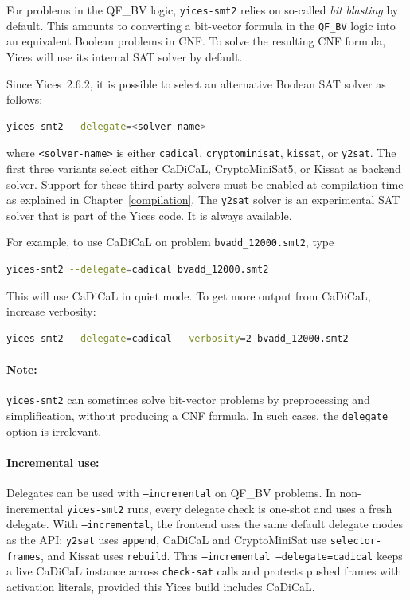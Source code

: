 \documentclass[11pt,twoside,fleqn,openright,titlepage]{cslreport}
\begin{document}
For problems in the QF\_BV logic, \texttt{yices-smt2} relies on
so-called \emph{bit blasting} by default. This amounts to
converting a bit-vector formula in the \texttt{QF\_BV} logic into an
equivalent Boolean problems in CNF. To solve the resulting CNF
formula, Yices will use its internal SAT solver by default.

\medskip\noindent
Since
Yices~2.6.2, it is possible to select an alternative Boolean SAT solver as follows:
\begin{small}
\begin{lstlisting}[language=sh]
   yices-smt2 --delegate=<solver-name>
\end{lstlisting}
\end{small}
where \texttt{<solver-name>} is either \texttt{cadical},
\texttt{cryptominisat}, \texttt{kissat}, or \texttt{y2sat}.  The first three variants
select either CaDiCaL, CryptoMiniSat5, or Kissat as backend solver. Support for these
third-party solvers must be enabled at compilation time as
explained in Chapter~\ref{compilation}. The \texttt{y2sat} solver is
an experimental SAT solver that is part of the Yices code. It is
always available.

\medskip\noindent
For example, to use CaDiCaL on problem \texttt{bvadd\_12000.smt2}, type
\begin{small}
\begin{lstlisting}[language=sh]
   yices-smt2 --delegate=cadical bvadd_12000.smt2
\end{lstlisting}
\end{small}
This will use CaDiCaL in quiet mode. To get more output from CaDiCaL, increase verbosity:
\begin{small}
\begin{lstlisting}[language=sh]
   yices-smt2 --delegate=cadical --verbosity=2 bvadd_12000.smt2
\end{lstlisting}
\end{small}

\paragraph{Note:} \texttt{yices-smt2} can sometimes solve bit-vector
problems by preprocessing and simplification, without producing a CNF
formula. In such cases, the \texttt{delegate} option is irrelevant.

\paragraph{Incremental use:} Delegates can be used with
\texttt{--incremental} on QF\_BV problems. In non-incremental
\texttt{yices-smt2} runs, every delegate check is one-shot and uses a
fresh delegate. With \texttt{--incremental}, the frontend uses the same
default delegate modes as the API: \texttt{y2sat} uses
\texttt{append}, CaDiCaL and CryptoMiniSat use
\texttt{selector-frames}, and Kissat uses \texttt{rebuild}. Thus
\texttt{--incremental --delegate=cadical} keeps a live CaDiCaL instance
across \texttt{check-sat} calls and protects pushed frames with
activation literals, provided this Yices build includes CaDiCaL.
\end{document}
